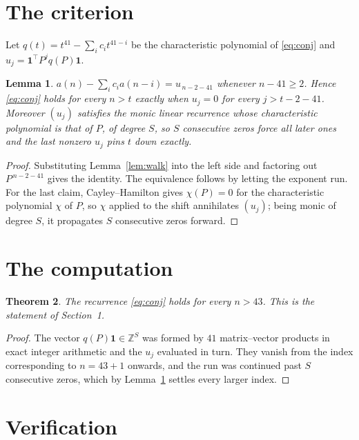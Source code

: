 \documentclass[11pt,a4paper]{article}
\theoremstyle{plain}
\newtheorem{theorem}{Theorem}
\newtheorem{lemma}[theorem]{Lemma}
\theoremstyle{definition}
\begin{document}
\section{The criterion}

Let $q(t)=t^{41}-\sum_i c_i t^{41-i}$ be the characteristic polynomial of
\eqref{eq:conj} and $u_j=\mathbf{1}^{\!\top}P^{j}q(P)\mathbf{1}$.

\begin{lemma}\label{lem:crit}
$a(n)-\sum_i c_i a(n-i)=u_{\,n-2-41}$ whenever $n-41\ge2$. Hence
\eqref{eq:conj} holds for every $n>t$ exactly when $u_j=0$ for every
$j>t-2-41$. Moreover $(u_j)$ satisfies the monic linear recurrence whose
characteristic polynomial is that of $P$, of degree $S$, so $S$ consecutive zeros force all
later ones and the last nonzero $u_j$ pins $t$ down exactly.
\end{lemma}

\begin{proof}
Substituting Lemma~\ref{lem:walk} into the left side and factoring out
$P^{\,n-2-41}$ gives the identity. The equivalence follows by letting the exponent
run. For the last claim, Cayley--Hamilton gives $\chi(P)=0$ for the characteristic
polynomial $\chi$ of $P$, so $\chi$ applied to the shift annihilates $(u_j)$; being monic of
degree $S$, it propagates $S$ consecutive zeros forward.
\end{proof}

\section{The computation}

\begin{theorem}
The recurrence \eqref{eq:conj} holds for every $n>43$. This is the statement of
Section~1.
\end{theorem}

\begin{proof}
The vector $q(P)\mathbf{1}\in\mathbb{Z}^{S}$ was formed by $41$ matrix--vector
products in exact integer arithmetic and the $u_j$ evaluated in turn. They vanish from the
index corresponding to $n=43+1$ onwards, and the run was continued past $S$ consecutive
zeros, which by Lemma~\ref{lem:crit} settles every larger index.
\end{proof}

\section{Verification}
\end{document}
